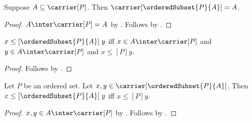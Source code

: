 \begin{corollary}\label{ordered_subset_carrier_of_subset}
    Suppose $A\subseteq\carrier[P]$.
    Then $\carrier[\orderedSubset{P}{A}]=A$.
\end{corollary}
\begin{proof}
    $A\inter\carrier[P]=A$ by
        .
    Follows by .
\end{proof}

\begin{proposition}\label{ordered_subset_order_iff}
    $x\mathrel{\leq[\orderedSubset{P}{A}]}y$ iff
        $x\in A\inter\carrier[P]$ and
        $y\in A\inter\carrier[P]$ and
        $x\mathrel{\leq[P]}y$.
\end{proposition}
\begin{proof}
    Follows by
        .
\end{proof}

\begin{proposition}\label{ordered_subset_order_iff_of_membership}
    Let $P$ be an ordered set.
    Let $x,y\in\carrier[\orderedSubset{P}{A}]$.
    Then $x\mathrel{\leq[\orderedSubset{P}{A}]}y$ iff
        $x\mathrel{\leq[P]}y$.
\end{proposition}
\begin{proof}
    $x,y\in A\inter\carrier[P]$ by
        .
    Follows by .
\end{proof}
